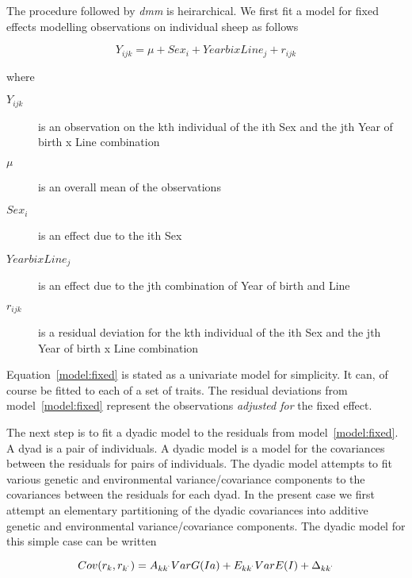 \documentclass[titlepage]{article}  %
\begin{document}
The procedure followed by {\em dmm} is heirarchical. We first fit a model for fixed effects modelling observations on individual sheep as follows

\begin{equation}
\label{model:fixed}
Y_{ijk} = \mu + Sex_{i} + YearbixLine_{j} + r_{ijk}
\end{equation}

where
\begin{description}
\item[$Y_{ijk}$] is an observation on the kth individual of the ith Sex and the jth Year of birth x Line combination
\item[$\mu$] is an overall mean of the observations
\item[$Sex_{i}$] is an effect due to the ith Sex
\item[$YearbixLine_{j}$] is an effect due to the jth combination of Year of birth and Line
\item[$r_{ijk}$] is a residual deviation for the kth individual of the ith Sex and the jth Year of birth x Line combination
\end{description}

Equation~\ref{model:fixed} is stated as a univariate model for simplicity. It can, of course be fitted to each of a set of traits. The residual deviations from model~\ref{model:fixed} represent the observations {\em adjusted for} the fixed effect.

The next step is to fit a dyadic model to the residuals from model~\ref{model:fixed}. A dyad is a pair of individuals. A dyadic model is a model for the covariances between the residuals for pairs of individuals. The dyadic model attempts to fit various genetic and environmental variance/covariance components to the covariances between the residuals for each dyad. In the present case we first attempt an elementary partitioning of the dyadic covariances into additive genetic and environmental variance/covariance components. The dyadic model for this simple case can be written

\begin{equation}
\label{model:dyadic}
Cov(r_{k},r_{k^{`}}) = A_{kk^{`}} VarG(Ia) + E_{kk^{`}} VarE(I) + \Delta_{kk^{`}}
\end{equation}
\end{document}
